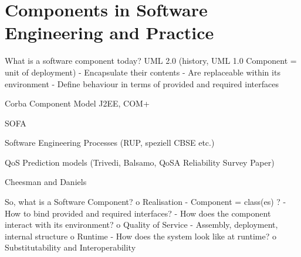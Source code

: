 \section{Components in Software Engineering and Practice}
\label{sec:ComponentsInSE}
What is a software component today?
UML 2.0 (history, UML 1.0 Component = unit of deployment)
-	Encapsulate their contents
-	Are replaceable within its environment
-	Define behaviour in terms of provided and required interfaces

Corba Component Model
J2EE, COM+

SOFA

Software Engineering Processes (RUP, speziell CBSE etc.)

QoS Prediction models (Trivedi, Balsamo, QoSA Reliability Survey Paper)

Cheesman and Daniels

So, what is a Software Component?
o	Realisation
-	Component = class(es) ?
-	How to bind provided and required interfaces?
-	How does the component interact with its environment?
o	Quality of Service
-	Assembly, deployment, internal structure
o	Runtime
-	How does the system look like at runtime?
o	Substitutability and Interoperability
